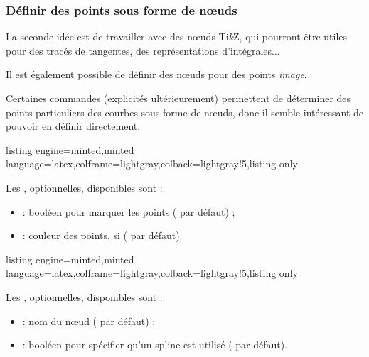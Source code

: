 \documentclass[11pt,a4paper]{ltxdoc}
\providecommand\tikzlogo{Ti\textit{k}Z}
\let\TikZ\tikzlogo
\begin{document}
\subsubsection{Définir des points sous forme de nœuds}\label{defpts}

La seconde idée est de travailler avec des nœuds \TikZ, qui pourront être utiles pour des tracés de tangentes, des représentations d'intégrales$\ldots$

\smallskip

Il est également possible de définir des nœuds pour des points \textit{image}.

\smallskip

Certaines commandes (explicités ultérieurement) permettent de déterminer des points particuliers des courbes sous forme de nœuds, donc il semble intéressant de pouvoir en définir directement.

\begin{tcblisting}{listing engine=minted,minted language=latex,colframe=lightgray,colback=lightgray!5,listing only}
\end{tcblisting}

Les \MontreCode{[clés]}, optionnelles, disponibles sont :

\smallskip

\begin{itemize}
  \item {} : booléen pour marquer les points ( par défaut) ;
  \item {} : couleur des points, si  ( par défaut).
\end{itemize}

\begin{tcblisting}{listing engine=minted,minted language=latex,colframe=lightgray,colback=lightgray!5,listing only}
\end{tcblisting}

Les \MontreCode{[clés]}, optionnelles, disponibles sont :

\smallskip

\begin{itemize}
  \item {} : nom du nœud ( par défaut) ;
  \item {} : booléen pour spécifier qu'un spline est utilisé ( par défaut).
\end{itemize}
\end{document}

